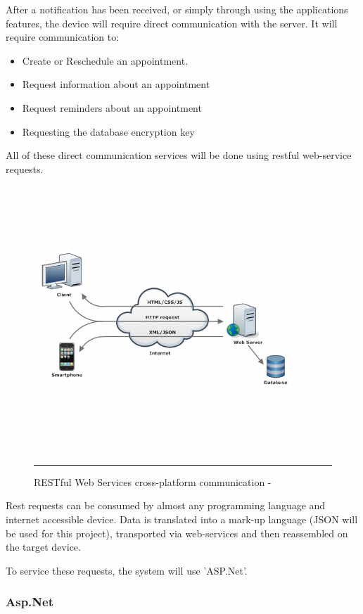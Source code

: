 After a notification has been received, or simply through using the applications features, the device will require direct communication with the server. It will require communication to:

\begin{itemize}
	\item Create or Reschedule an appointment.
	\item Request information about an appointment
	\item Request reminders about an appointment
	\item Requesting the database encryption key
\end{itemize}

All of these direct communication services will be done using restful web-service requests.

\begin{figure}[htbp]
	\centering
\includegraphics[width=10cm,height=10cm,keepaspectratio]{Figures/rest.png}
		\rule{35em}{0.5pt}
	\caption[RESTful Web Services cross-platform communication - \cite{rest}]{RESTful Web Services cross-platform communication - \cite{rest}}
	\label{fig:rest}
\end{figure}

Rest requests can be consumed by almost any programming language and internet accessible device. Data is translated into a mark-up language (JSON will be used for this project), transported via web-services and then reassembled on the target device.

To service these requests, the system will use 'ASP.Net'.

\subsubsection{Asp.Net}

